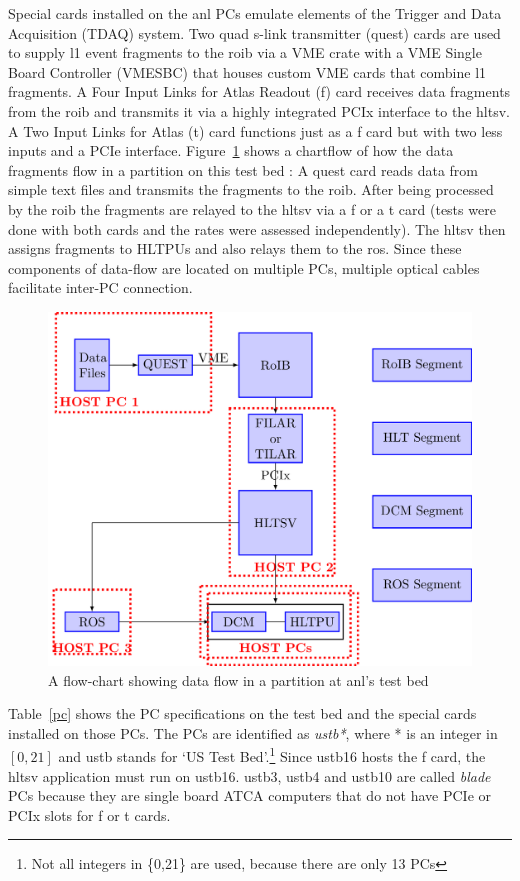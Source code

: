 \par Special cards installed on the \acrshort{anl} PCs emulate elements of the 
Trigger and Data Acquisition (TDAQ) system. Two quad s-link transmitter (\acrshort{quest}) 
cards are used to supply \acrshort{l1} event fragments to the \acrshort{roib} via a VME crate with
 a VME Single Board Controller (VMESBC) that houses custom VME cards that combine \acrshort{l1} fragments. 
A Four Input Links for Atlas Readout (\acrshort{f}) card receives data fragments from the \acrshort{roib} 
and transmits it via a highly integrated PCIx interface to the \acrshort{hltsv}. A Two Input Links for 
Atlas (\acrshort{t}) card functions just as a \acrshort{f} card but with two less inputs and a PCIe interface.
Figure~\ref{filar} shows a chartflow of how the data fragments flow 
in a partition on this test bed : A \acrshort{quest} card reads data from simple text files and transmits 
the fragments to the \acrshort{roib}. After being processed by the \acrshort{roib} the fragments are 
relayed to the \acrshort{hltsv} via a \acrshort{f} or a \acrshort{t} card (tests were done with 
both cards and the rates were assessed independently). The \acrshort{hltsv} then assigns fragments 
to HLTPUs and also relays them to the \acrshort{ros}. Since these components of data-flow are 
located on multiple PCs, multiple optical cables facilitate inter-PC connection. 

\begin{figure}[!h]
\centering
\includegraphics[width=0.8\linewidth]{figures/filar.png}
\caption{A flow-chart showing data flow in a partition at \acrshort{anl}'s test bed}
\label{filar}
\end{figure}

\par Table~\ref{pc} shows the PC specifications on the test bed and the special cards installed on 
those PCs. The PCs are identified as {\it ustb*}, where * is an integer in $[0,21]$ 
and ustb stands for `US Test Bed'.\footnote{Not all integers in \{0,21\} are used, because there are only 13 PCs} 
Since ustb16 hosts the \acrshort{f} card, the \acrshort{hltsv} application must run on ustb16. ustb3, ustb4
 and ustb10 are called {\it blade} PCs because they are single board ATCA computers that do not have 
PCIe or PCIx slots for \acrshort{f} or \acrshort{t} cards.  

